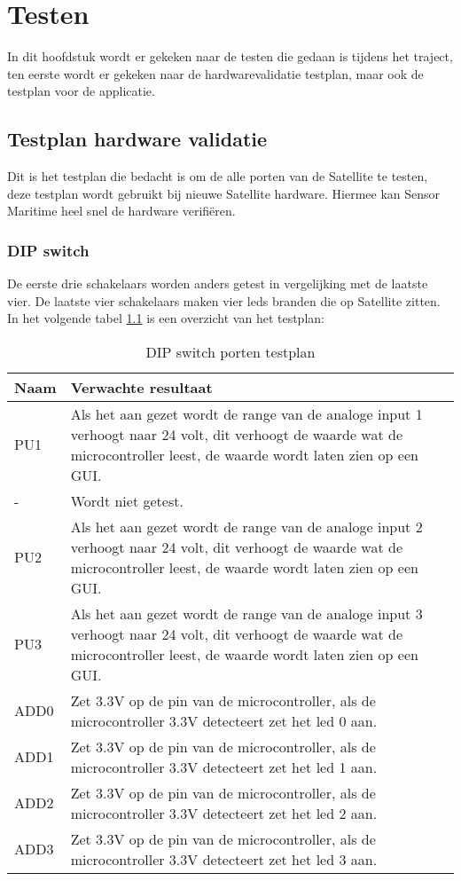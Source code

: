 \chapter{Testen}
In dit hoofdstuk wordt er gekeken naar de testen die gedaan is tijdens het traject, ten eerste wordt er gekeken naar de hardwarevalidatie testplan, maar ook de testplan voor de applicatie. 

\section{Testplan hardware validatie} \label{sec:hwtestplan}
Dit is het testplan die bedacht is om de alle porten van de Satellite te testen, deze testplan wordt gebruikt bij nieuwe Satellite hardware. Hiermee kan Sensor Maritime heel snel de hardware verifiëren.
\subsection{DIP switch}
De eerste drie schakelaars worden anders getest in vergelijking met de laatste vier. De laatste vier schakelaars maken vier leds branden die op Satellite zitten. In het volgende tabel \ref{tab:hw_val_dip_testplan} is een overzicht van het testplan:
\begin{table}[h!]
	\caption{DIP switch porten testplan}
	\begin{tabular}{lp{14.5cm}}
	\toprule
	\textbf{Naam} 	& \textbf{Verwachte resultaat} \\ \toprule
	PU1				& Als het aan gezet wordt de range van de analoge input 1 verhoogt naar 24 volt, dit verhoogt de waarde wat de microcontroller leest, de waarde wordt laten zien op een GUI.\\
	-				& Wordt niet getest. \\
	PU2				& Als het aan gezet wordt de range van de analoge input 2 verhoogt naar 24 volt, dit verhoogt de waarde wat de microcontroller leest, de waarde wordt laten zien op een GUI.\\
	PU3				& Als het aan gezet wordt de range van de analoge input 3 verhoogt  naar 24 volt, dit verhoogt de waarde wat de microcontroller leest, de waarde wordt laten zien op een GUI. \\
	ADD0 			& Zet 3.3V op de pin van de microcontroller, als de microcontroller 3.3V detecteert zet het led 0 aan.\\
	ADD1 			& Zet 3.3V op de pin van de microcontroller, als de microcontroller 3.3V detecteert zet het led 1 aan.\\
	ADD2 			& Zet 3.3V op de pin van de microcontroller, als de microcontroller 3.3V detecteert zet het led 2 aan.\\
	ADD3 			& Zet 3.3V op de pin van de microcontroller, als de microcontroller 3.3V detecteert zet het led 3 aan.\\ \bottomrule
	\end{tabular}
	\label{tab:hw_val_dip_testplan}
\end{table}

